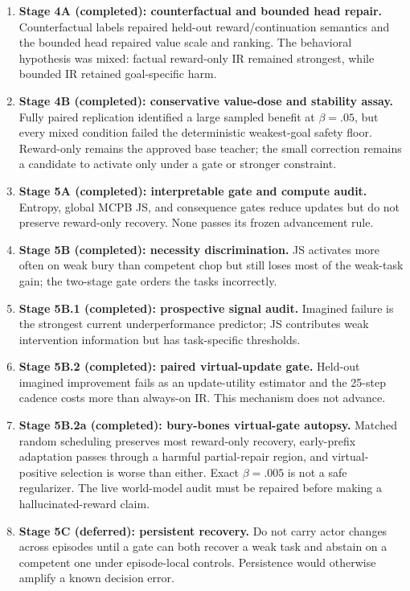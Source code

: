 \documentclass[10pt]{article}
\begin{document}
\begin{enumerate}
  \item \textbf{Stage 4A (completed): counterfactual and bounded head repair.} Counterfactual labels repaired held-out reward/continuation semantics and the bounded head repaired value scale and ranking. The behavioral hypothesis was mixed: factual reward-only IR remained strongest, while bounded IR retained goal-specific harm.
  \item \textbf{Stage 4B (completed): conservative value-dose and stability assay.} Fully paired replication identified a large sampled benefit at $\beta=.05$, but every mixed condition failed the deterministic weakest-goal safety floor. Reward-only remains the approved base teacher; the small correction remains a candidate to activate only under a gate or stronger constraint.
  \item \textbf{Stage 5A (completed): interpretable gate and compute audit.} Entropy, global MCPB JS, and consequence gates reduce updates but do not preserve reward-only recovery. None passes its frozen advancement rule.
  \item \textbf{Stage 5B (completed): necessity discrimination.} JS activates more often on weak bury than competent chop but still loses most of the weak-task gain; the two-stage gate orders the tasks incorrectly.
  \item \textbf{Stage 5B.1 (completed): prospective signal audit.} Imagined failure is the strongest current underperformance predictor; JS contributes weak intervention information but has task-specific thresholds.
  \item \textbf{Stage 5B.2 (completed): paired virtual-update gate.} Held-out imagined improvement fails as an update-utility estimator and the 25-step cadence costs more than always-on IR. This mechanism does not advance.
  \item \textbf{Stage 5B.2a (completed): bury-bones virtual-gate autopsy.} Matched random scheduling preserves most reward-only recovery, early-prefix adaptation passes through a harmful partial-repair region, and virtual-positive selection is worse than either. Exact $\beta=.005$ is not a safe regularizer. The live world-model audit must be repaired before making a hallucinated-reward claim.
  \item \textbf{Stage 5C (deferred): persistent recovery.} Do not carry actor changes across episodes until a gate can both recover a weak task and abstain on a competent one under episode-local controls. Persistence would otherwise amplify a known decision error.

\end{enumerate}
\end{document}
